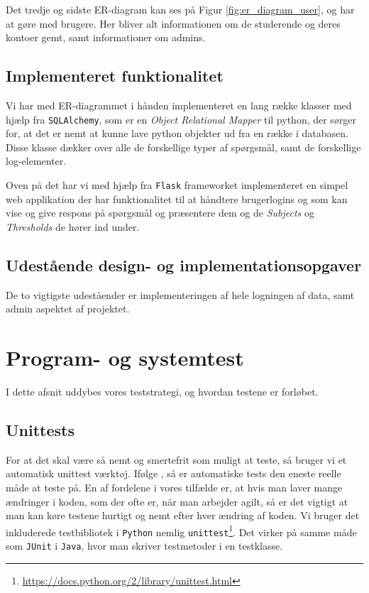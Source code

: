 \documentclass[11pt, a4paper]{article}
\begin{document}
Det tredje og sidste ER-diagram kan ses på Figur \ref{fig:er_diagram_user}, og har at gøre med brugere. Her bliver alt informationen om de studerende og deres kontoer gemt, samt informationer om admins.

\subsection{Implementeret funktionalitet}
\label{sub:implementeret_funktionalitet}
Vi har med ER-diagrammet i hånden implementeret en lang række klasser med hjælp fra \verb!SQLAlchemy!, som er en \emph{Object Relational Mapper} til python, der sørger for, at det er nemt at kunne lave python objekter ud fra en række i databasen. Disse klasse dækker over alle de forskellige typer af spørgsmål, samt de forskellige log-elementer.

Oven på det har vi med hjælp fra \verb!Flask! frameworket implementeret en simpel web applikation der har funktionalitet til at håndtere brugerlogins og som kan vise og give respons på spørgsmål og præsentere dem og de \emph{Subjects} og \emph{Thresholds} de hører ind under.

\subsection{Udestående design- og implementationsopgaver}
\label{sub:udestaende_design_og_implementationsopgaver}
De to vigtigste udeståender er implementeringen af hele logningen af data, samt admin aspektet af projektet.


\section{Program- og systemtest}
\label{sec:program_og_systemtest}
I dette afsnit uddybes vores teststrategi, og hvordan testene er forløbet.
\subsection{Unittests}
\label{sub:unittests}
For at det skal være så nemt og smertefrit som muligt at teste, så bruger vi et automatisk unittest værktøj. Ifølge \cite{COCO}, så er automatiske tests den eneste reelle måde at teste på. En af fordelene i vores tilfælde er, at hvis man laver mange ændringer i koden, som der ofte er, når man arbejder agilt, så er det vigtigt at man kan køre testene hurtigt og nemt efter hver ændring af koden. Vi bruger det inkluderede testbibliotek i \verb!Python! nemlig \verb!unittest!\footnote{\url{https://docs.python.org/2/library/unittest.html}}. Det virker på samme måde som \verb!JUnit! i \verb!Java!, hvor man skriver testmetoder i en testklasse.
\end{document}
